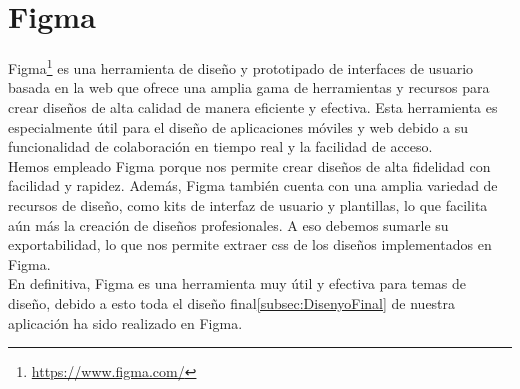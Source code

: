 \section{Figma}\label{sec:Figma}
Figma\footnote{\url{https://www.figma.com/}} es una herramienta de diseño y prototipado de interfaces de usuario basada en la web que ofrece una amplia gama de herramientas y recursos para crear diseños de alta calidad de manera eficiente y efectiva. Esta herramienta es especialmente útil para el diseño de aplicaciones móviles y web debido a su funcionalidad de colaboración en tiempo real y la facilidad de acceso.
\\
Hemos empleado Figma porque nos permite crear diseños de alta fidelidad con facilidad y rapidez. Además, Figma también cuenta con una amplia variedad de recursos de diseño, como kits de interfaz de usuario y plantillas, lo que facilita aún más la creación de diseños profesionales. A eso debemos sumarle su exportabilidad, lo que nos permite extraer css de los diseños implementados en Figma.
\\
En definitiva, Figma es una herramienta muy útil y efectiva para temas de diseño, debido a esto toda el diseño final\ref{subsec:DisenyoFinal} de nuestra aplicación ha sido realizado en Figma.